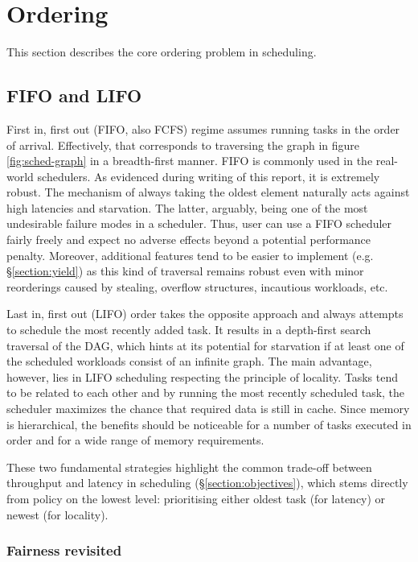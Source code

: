 \documentclass[12pt,a4paper,twoside]{report}
\begin{document}
\section{Ordering}
\label{section:approaches}
This section describes the core ordering problem in scheduling.

\subsection{FIFO and LIFO}
\label{section:ordering}
First in, first out (FIFO, also FCFS) regime assumes running tasks in the order of arrival. Effectively, that corresponds to traversing the graph in figure \ref{fig:sched-graph} in a breadth-first manner. FIFO is commonly used in the real-world schedulers. As evidenced during writing of this report, it is extremely robust. The mechanism of always taking the oldest element naturally acts against high latencies and starvation. The latter, arguably, being one of the most undesirable failure modes in a scheduler. Thus, user can use a FIFO scheduler fairly freely and expect no adverse effects beyond a potential performance penalty. Moreover, additional features tend to be easier to implement (e.g. \S\ref{section:yield}) as this kind of traversal remains robust even with minor reorderings caused by stealing, overflow structures, incautious workloads, etc.

Last in, first out (LIFO) order takes the opposite approach and always attempts to schedule the most recently added task. It results in a depth-first search traversal of the DAG, which hints at its potential for starvation if at least one of the scheduled workloads consist of an infinite graph. The main advantage, however, lies in LIFO scheduling respecting the principle of locality. Tasks tend to be related to each other and by running the most recently scheduled task, the scheduler maximizes the chance that required data is still in cache. Since memory is hierarchical, the benefits should be noticeable for a number of tasks executed in order and for a wide range of memory requirements. 

These two fundamental strategies highlight the common trade-off between throughput and latency in scheduling (\S\ref{section:objectives}), which stems directly from policy on the lowest level: prioritising either oldest task (for latency) or newest (for locality). 


\subsubsection{Fairness revisited}
\label{section:fairness-revisited}
\end{document}

